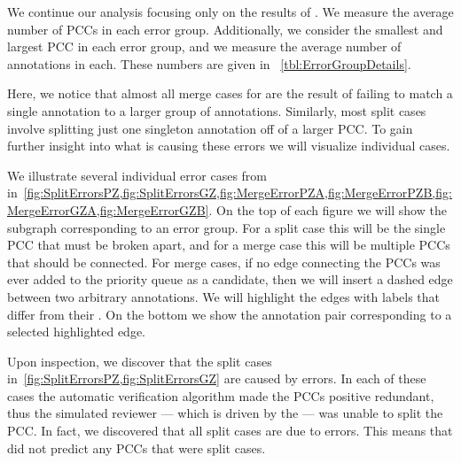     We continue our analysis focusing only on the results of .
    We measure the average number of PCCs in each error group.
    Additionally, we consider the smallest and largest PCC in each error group, and we measure the average number
      of annotations in each.
    These numbers are given in ~\cref{tbl:ErrorGroupDetails}.

    Here, we notice that almost all merge cases for  are the result of failing to match a single
      annotation to a larger group of annotations.
    Similarly, most split cases involve splitting just one singleton annotation off of a larger PCC.
    To gain further insight into what is causing these errors we will visualize individual cases.


    \ErrorSizeDetails{}

    \ErrorGroupDetails{}

    \FloatBarrier{}

    We illustrate several individual error cases from 
    in~\cref{fig:SplitErrorsPZ,fig:SplitErrorsGZ,fig:MergeErrorPZA,fig:MergeErrorPZB,fig:MergeErrorGZA,fig:MergeErrorGZB}.
    On the top of each figure we will show the subgraph corresponding to an error group.
    For a split case this will be the single PCC that must be broken apart, and for a merge case this will be
      multiple PCCs that should be connected.
    For merge cases, if no edge connecting the PCCs was ever added to the priority queue as a candidate, then we
      will insert a dashed edge between two arbitrary annotations.
    We will highlight the edges with labels that differ from their \groundtruth{}.
    On the bottom we show the annotation pair corresponding to a selected highlighted edge.

    Upon inspection, we discover that the split cases in~\cref{fig:SplitErrorsPZ,fig:SplitErrorsGZ} are caused by
      \groundtruth{} errors.
    In each of these cases the automatic verification algorithm made the PCCs positive redundant, thus the
      simulated reviewer --- which is driven by the \groundtruth{} --- was unable to split the PCC.
    In fact, we discovered that all split cases are due to \groundtruth{} errors.
    This means that  did not predict any PCCs that were split cases.

